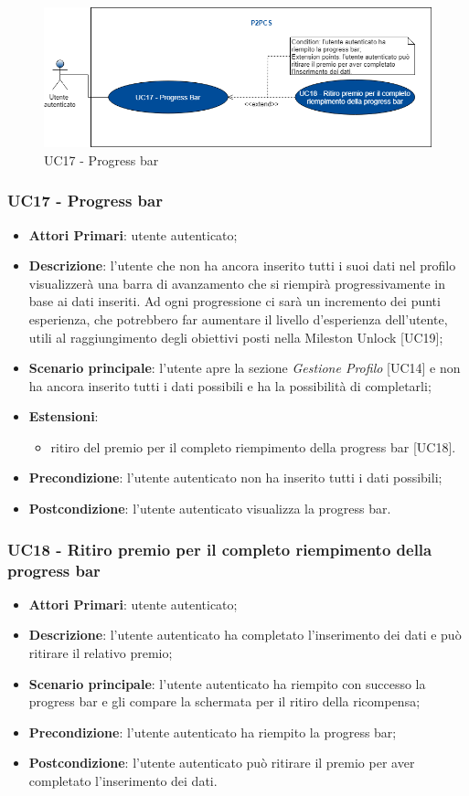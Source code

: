 \begin{figure}[h]
	\includegraphics[width=13cm]{res/images/Schemagenerale7.png}
	\centering
	\caption{UC17 - Progress bar}
\end{figure}
\subsubsection{UC17 - Progress bar}
\begin{itemize}
	\item \textbf{Attori Primari}: utente autenticato;
	\item \textbf{Descrizione}: l'utente che non ha ancora inserito tutti i suoi dati nel profilo visualizzerà una barra di avanzamento che si riempirà progressivamente in base ai dati inseriti. Ad ogni progressione ci sarà un incremento dei punti esperienza, che potrebbero far aumentare il livello d'esperienza dell'utente, utili al raggiungimento degli obiettivi posti nella Mileston Unlock [UC19];
	\item \textbf{Scenario principale}: l'utente apre la sezione \textit{Gestione Profilo} [UC14] e non ha ancora inserito tutti i dati possibili e ha la possibilità di completarli;
	\item \textbf{Estensioni}:
	\begin{itemize}
		\item ritiro del premio per il completo riempimento della progress bar [UC18].
	\end{itemize}
	\item \textbf{Precondizione}: l'utente autenticato non ha inserito tutti i dati possibili;
	\item \textbf{Postcondizione}: l'utente autenticato visualizza la progress bar.
\end{itemize}
\subsubsection{UC18 - Ritiro premio per il completo riempimento della progress bar}
\begin{itemize}
	\item \textbf{Attori Primari}: utente autenticato;
	\item \textbf{Descrizione}: l'utente autenticato ha completato l'inserimento dei dati e può ritirare il relativo premio;	
	\item \textbf{Scenario principale}: l'utente autenticato ha riempito con successo la progress bar e gli compare la schermata per il ritiro della ricompensa;
	\item \textbf{Precondizione}: l'utente autenticato ha riempito la progress bar;
	\item \textbf{Postcondizione}: l'utente autenticato può ritirare il premio per aver completato l'inserimento dei dati.
\end{itemize}
